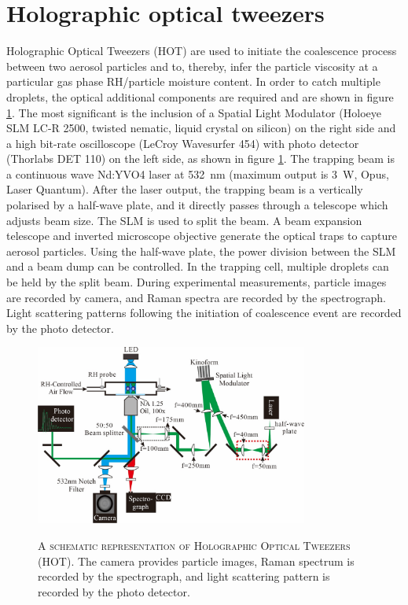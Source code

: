 \section{Holographic optical tweezers}
Holographic Optical Tweezers (HOT) are used to initiate the coalescence process between two aerosol particles and to, thereby, infer the particle viscosity at a particular gas phase RH/particle moisture content\cite{Song2016a}. In order to catch multiple droplets, the optical additional components are required and are shown in figure \ref{fig:wat_s5}. The most significant is the inclusion of a Spatial Light Modulator (Holoeye SLM LC-R 2500, twisted nematic, liquid crystal on silicon) on the right side and a high bit-rate oscilloscope (LeCroy Wavesurfer 454) with photo detector (Thorlabs DET 110) on the left side, as shown in figure \ref{fig:wat_s5}. The trapping beam is a continuous wave Nd:YVO4 laser at \SI{532}{\nano\meter} (maximum output is \SI{3}{\watt}, Opus, Laser Quantum). After the laser output, the trapping beam is a vertically polarised by a half-wave plate, and it directly passes through a telescope which adjusts beam size. The SLM is used to split the beam. A beam expansion telescope and inverted microscope objective generate the optical traps to capture aerosol particles. Using the half-wave plate, the power division between the SLM and a beam dump can be controlled. In the trapping cell, multiple droplets can be held by the split beam. During experimental measurements, particle images are recorded by camera, and Raman spectra are recorded by the spectrograph. Light scattering patterns following the initiation of coalescence event are recorded by the photo detector.

\begin{figure}
    \centering
    \caption[A schematic representation of Holographic Optical Tweezers (HOT)]{\textsc{A schematic representation of Holographic Optical Tweezers (HOT)}. The camera provides particle images, Raman spectrum is recorded by the spectrograph, and light scattering pattern is recorded by the photo detector\cite{Song2016a}.}
    \includegraphics[width=0.8\textwidth]{chapters/water_hopping/figures/image011.jpg}
    \label{fig:wat_s5}
\end{figure}

